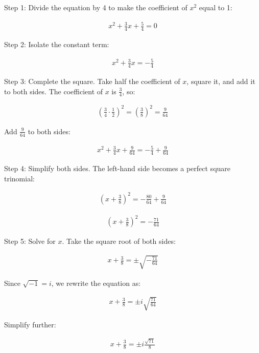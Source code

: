 \documentclass[journal]{IEEEtran}
\begin{document}
Step 1: Divide the equation by 4 to make the coefficient of \( x^2 \) equal to 1:

\begin{align}
x^2 + \frac{3}{4}x + \frac{5}{4} = 0
\end{align}

Step 2: Isolate the constant term:

\begin{align}
x^2 + \frac{3}{4}x = -\frac{5}{4}
\end{align}

Step 3: Complete the square. Take half the coefficient of \( x \), square it, and add it to both sides. The coefficient of \( x \) is \( \frac{3}{4} \), so:

\begin{align}
\left(\frac{3}{4} \cdot \frac{1}{2}\right)^2 = \left(\frac{3}{8}\right)^2 = \frac{9}{64}
\end{align}

Add \( \frac{9}{64} \) to both sides:

\begin{align}
x^2 + \frac{3}{4}x + \frac{9}{64} = -\frac{5}{4} + \frac{9}{64}
\end{align}

Step 4: Simplify both sides. The left-hand side becomes a perfect square trinomial:

\begin{align}
\left(x + \frac{3}{8}\right)^2 = -\frac{80}{64} + \frac{9}{64}
\end{align}

\begin{align}
\left(x + \frac{3}{8}\right)^2 = -\frac{71}{64}
\end{align}

Step 5: Solve for \( x \). Take the square root of both sides:

\begin{align}
x + \frac{3}{8} = \pm \sqrt{-\frac{71}{64}}
\end{align}

Since \( \sqrt{-1} = i \), we rewrite the equation as:

\begin{align}
x + \frac{3}{8} = \pm i \sqrt{\frac{71}{64}}
\end{align}

Simplify further:

\begin{align}
x + \frac{3}{8} = \pm i \frac{\sqrt{71}}{8}
\end{align}
\end{document}
